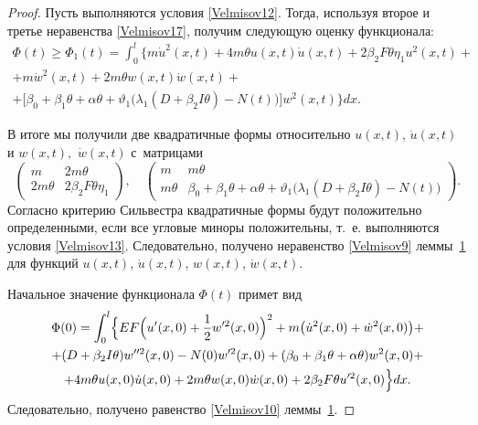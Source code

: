 \begin{proof}
Пусть выполняются условия \eqref{Velmisov12}.  
Тогда, используя второе и третье неравенства \eqref{Velmisov17}, получим следующую оценку функционала:
\begin{multline}
\label{Velmisov18} 
\Phi(t)\ge \Phi _{1} (t)=
\int_{0}^{l} 
\bigl\{ m\dot{u}^{2} (x,t)+4m\theta u(x,t)\dot{u}(x,t)+2\beta _{2}F \theta \eta _{1} u^{2} (x,t)+
\\ 
+m\dot{w}^{2} (x,t)+2m\theta w(x,t)\dot{w}(x,t)+
\\
 +
 \bigl[\beta _{0} +\beta _{1} \theta +\alpha \theta +\vartheta _{1} 
 \bigl(\lambda _{1} (D+\beta _{2} I\theta )-N(t) \bigr)\bigr]w^{2} (x,t)\bigr\}dx.
\end{multline}

В итоге мы получили две квадратичные формы относительно $u(x,t)$, $\dot{u}(x,t)$ и $w(x,t),$ $\dot{w}(x,t)$ с~матрицами
$$
\left(\begin{array}{cc} {m} & {2m\theta}
 \\ {2m\theta} & {2\beta _{2}F \theta \eta _{1} } \end{array}\right),\quad
 \left(\begin{array}{cc} {m} & {m\theta}
 \\ {m\theta} & \beta _{0} +\beta _{1} \theta +\alpha \theta +\vartheta _{1} \bigl(\lambda _{1} (D+\beta _{2} I\theta )-N(t)\bigr)  \end{array}\right).
$$ 
Согласно критерию Сильвестра квадратичные формы будут положительно определенными, если все угловые миноры положительны, т.~е. выполняются условия \eqref{Velmisov13}.
Следовательно, получено неравенство \eqref{Velmisov9} леммы~\hyperlink{Velm:lemma1}{1} для функций $u(x,t)$, $\dot{u}(x,t)$, $w(x,t)$, $\dot{w}(x,t)$.

Начальное значение функционала $\Phi(t)$ примет вид
\begin{multline}
\label{Velmisov19} 
\Phi (0)=
\int_{0}^{l}
\Bigl\{ 
EF\Bigl(u'(x,0)+\frac{1}{2} w'^{2} (x,0)\Bigr)^{2} +
m\bigl(\dot{u}^{2} (x,0)+\dot{w}^{2} (x,0)\bigr)+
\\ 
+(D+\beta _{2}I \theta )w''^{2} (x,0)-N(0)w'^{2} (x,0)+ (\beta _{0} +\beta _{1} \theta +\alpha \theta )w^{2} (x,0)+
\\
+4m\theta u(x,0)\dot{u}(x,0)+2m\theta w(x,0)\dot{w}(x,0)+2\beta _{2}F \theta u'^{2} (x,0)\Bigr\}dx.
\end{multline}
Следовательно, получено равенство \eqref{Velmisov10} леммы~\hyperlink{Velm:lemma1}{1}.


\end{proof}
